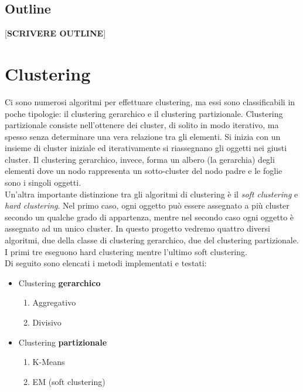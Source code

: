 \documentclass{llncs}
\newcommand{\acapo}{\vspace{0.5\baselineskip}\\}
\begin{document}
	\subsection{Outline}
	[\textbf{SCRIVERE OUTLINE}]
	\section{Clustering}
	Ci sono numerosi algoritmi per effettuare clustering, ma essi sono classificabili in poche tipologie: il clustering gerarchico e il clustering partizionale.
	Clustering partizionale consiste nell'ottenere dei cluster, di solito in modo iterativo, ma spesso senza determinare una vera relazione tra gli elementi. Si inizia con un insieme di cluster iniziale ed iterativamente
	si riassegnano gli oggetti nei giusti cluster. Il clustering gerarchico, invece, forma un albero (la gerarchia) degli elementi dove un nodo rappresenta un sotto-cluster del nodo padre e le foglie sono i singoli
	oggetti.
	\acapo
	Un'altra importante distinzione tra gli algoritmi di clustering è il \textit{soft clustering} e \textit{hard clustering}. Nel primo caso, ogni oggetto può essere assegnato a più cluster secondo un qualche
	grado di appartenza, mentre nel secondo caso ogni oggetto è assegnato ad un unico cluster. In questo progetto vedremo quattro diversi algoritmi, due della classe di clustering gerarchico, due del clustering partizionale.
	I primi tre eseguono hard clustering mentre l'ultimo soft clustering.
	\acapo
	Di seguito sono elencati i metodi implementati e testati:
	\begin{itemize}
		\item Clustering \textbf{gerarchico}
		\begin{enumerate}
			\item Aggregativo
			\item Divisivo
		\end{enumerate}

		\item Clustering \textbf{partizionale}
		\begin{enumerate}
			\item K-Means
			\item EM (soft clustering)
		\end{enumerate}
	\end{itemize}
	
\end{document}
